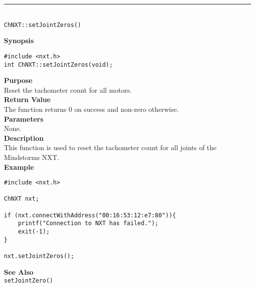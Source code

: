 \noindent
\vspace{5pt}
\rule{4.5in}{0.015in}\\
\noindent
{\LARGE \texttt{ChNXT::setJointZeros()} }\\


\noindent
{\bf Synopsis}
\begin{lstlisting}
#include <nxt.h>
int ChNXT::setJointZeros(void);
\end{lstlisting}

\noindent
{\bf Purpose}\\
Reset the tachometer count for all motors.\\

\noindent
{\bf Return Value}\\
The function returns 0 on success and non-zero otherwise.\\

\noindent
{\bf Parameters}\\
None.\\

\noindent
{\bf Description}\\
This function is used to reset the tachometer count for 
all joints of the Mindstorms NXT.\\

\noindent
{\bf Example}
\begin{lstlisting}
#include <nxt.h> 

ChNXT nxt;

if (nxt.connectWithAddress("00:16:53:12:e7:80")){
    printf("Connection to NXT has failed.");
    exit(-1);
}
    
nxt.setJointZeros();
\end{lstlisting}

\noindent
{\bf See Also}\\
\texttt{setJointZero()}\\
